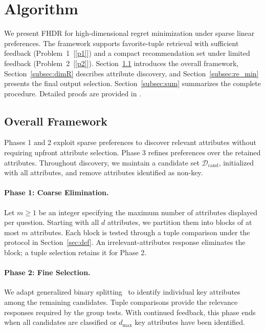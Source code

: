\section{Algorithm}
\label{sec:alg}

We present \textsc{FHDR} for high-dimensional regret minimization under sparse linear preferences. The framework supports favorite-tuple retrieval with sufficient feedback (Problem~1~[\ref{p1}]) and a compact recommendation set under limited feedback (Problem~2~[\ref{p2}]). Section~\ref{subsec:framework} introduces the overall framework, Section~\ref{subsec:dimR} describes attribute discovery, and Section~\ref{subsec:re_min} presents the final output selection. Section~\ref{subsec:sum} summarizes the complete procedure. Detailed proofs are provided in \iftoggle{TechnicalReport}{Section~\ref{appen:proof} of the \technicalreport}{Appendix~\ref{appen:proof}}.

\subsection{Overall Framework}
\label{subsec:framework}

Phases 1 and 2 exploit sparse preferences to discover relevant attributes without requiring upfront attribute selection. Phase 3 refines preferences over the retained attributes. Throughout discovery, we maintain a candidate set $\mathcal{D}_\text{cand}$, initialized with all attributes, and remove attributes identified as non-key.

\paragraph{Phase 1: Coarse Elimination.}
Let $m\geq1$ be an integer specifying the maximum number of attributes displayed per question. Starting with all $d$ attributes, we partition them into blocks of at most $m$ attributes. Each block is tested through a tuple comparison under the protocol in Section~\ref{sec:def}. An irrelevant-attributes response eliminates the block; a tuple selection retains it for Phase 2.

\paragraph{Phase 2: Fine Selection.}
We adapt generalized binary splitting~\cite{hwang1972method} to identify individual key attributes among the remaining candidates. Tuple comparisons provide the relevance responses required by the group tests. With continued feedback, this phase ends when all candidates are classified or $d_\text{max}$ key attributes have been identified.

